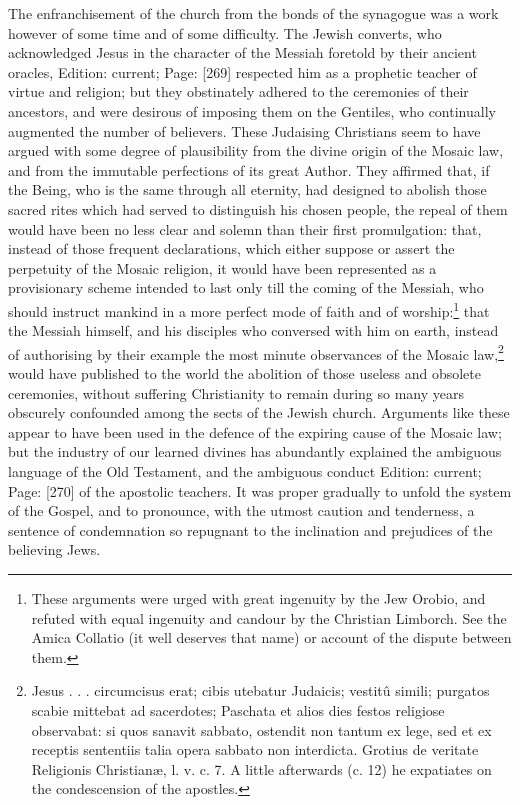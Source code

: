 The enfranchisement of the church from the bonds of the synagogue was a work however of some time and of some difficulty. The Jewish converts, who acknowledged Jesus in the character of the Messiah foretold by their ancient oracles, Edition: current; Page: [269] respected him as a prophetic teacher of virtue and religion; but they obstinately adhered to the ceremonies of their ancestors, and were desirous of imposing them on the Gentiles, who continually augmented the number of believers. These Judaising Christians seem to have argued with some degree of plausibility from the divine origin of the Mosaic law, and from the immutable perfections of its great Author. They affirmed that, if the Being, who is the same through all eternity, had designed to abolish those sacred rites which had served to distinguish his chosen people, the repeal of them would have been no less clear and solemn than their first promulgation: that, instead of those frequent declarations, which either suppose or assert the perpetuity of the Mosaic religion, it would have been represented as a provisionary scheme intended to last only till the coming of the Messiah, who should instruct mankind in a more perfect mode of faith and of worship:\footnote{These arguments were urged with great ingenuity by the Jew Orobio, and refuted with equal ingenuity and candour by the Christian Limborch. See the Amica Collatio (it well deserves that name) or account of the dispute between them.} that the Messiah himself, and his disciples who conversed with him on earth, instead of authorising by their example the most minute observances of the Mosaic law,\footnote{Jesus . . . circumcisus erat; cibis utebatur Judaicis; vestitû simili; purgatos scabie mittebat ad sacerdotes; Paschata et alios dies festos religiose observabat: si quos sanavit sabbato, ostendit non tantum ex lege, sed et ex receptis sententiis talia opera sabbato non interdicta. Grotius de veritate Religionis Christianæ, l. v. c. 7. A little afterwards (c. 12) he expatiates on the condescension of the apostles.} would have published to the world the abolition of those useless and obsolete ceremonies, without suffering Christianity to remain during so many years obscurely confounded among the sects of the Jewish church. Arguments like these appear to have been used in the defence of the expiring cause of the Mosaic law; but the industry of our learned divines has abundantly explained the ambiguous language of the Old Testament, and the ambiguous conduct Edition: current; Page: [270] of the apostolic teachers. It was proper gradually to unfold the system of the Gospel, and to pronounce, with the utmost caution and tenderness, a sentence of condemnation so repugnant to the inclination and prejudices of the believing Jews.

